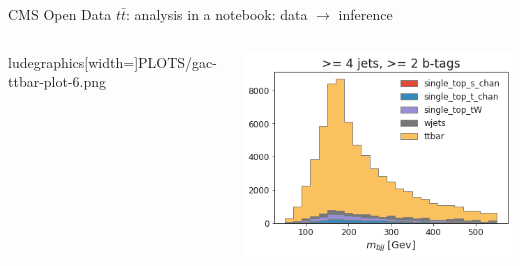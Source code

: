 \documentclass[aspectratio=169]{beamer}
\begin{document}
\begin{frame}{CMS Open Data $t\bar{t}$: analysis in a notebook: data $\to$ inference}
\begin{columns}
\begin{columns}
ludegraphics[width=\linewidth]{PLOTS/gac-ttbar-plot-6.png}

\includegraphics[width=\linewidth]{PLOTS/gac-ttbar-plot-1.png}


\end{columns}
\end{columns}
\end{frame}
\end{document}
